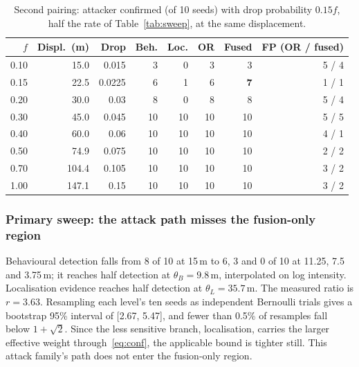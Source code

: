 \begin{table}[!t]
\caption{Second pairing: attacker confirmed (of 10 seeds) with drop probability
$0.15f$, half the rate of Table~\ref{tab:sweep}, at the same displacement.}
\label{tab:sweep2}
\centering
\small
\setlength{\tabcolsep}{4pt}
\begin{tabular}{@{}rrrrrrrr@{}}
\toprule
$f$ & Displ.\ (m) & Drop & Beh. & Loc. & OR & Fused & FP (OR / fused) \\
\midrule
0.10 & 15.0 & 0.015 & 3 & 0 & 3 & 3 & 5 / 4 \\
0.15 & 22.5 & 0.0225 & 6 & 1 & 6 & \textbf{7} & 1 / 1 \\
0.20 & 30.0 & 0.03 & 8 & 0 & 8 & 8 & 5 / 4 \\
0.30 & 45.0 & 0.045 & 10 & 10 & 10 & 10 & 5 / 5 \\
0.40 & 60.0 & 0.06 & 10 & 10 & 10 & 10 & 4 / 1 \\
0.50 & 74.9 & 0.075 & 10 & 10 & 10 & 10 & 2 / 2 \\
0.70 & 104.4 & 0.105 & 10 & 10 & 10 & 10 & 3 / 2 \\
1.00 & 147.1 & 0.15 & 10 & 10 & 10 & 10 & 3 / 2 \\
\bottomrule
\end{tabular}
\end{table}

\subsubsection{Primary sweep: the attack path misses the fusion-only region}

Behavioural detection falls from 8 of 10 at 15\,m to 6, 3 and 0 of 10 at 11.25,
7.5 and 3.75\,m; it reaches half detection at $\theta_B = 9.8$\,m, interpolated
on log intensity. Localisation evidence reaches half detection at
$\theta_L = 35.7$\,m. The measured ratio is $r = 3.63$. Resampling each level's
ten seeds as independent Bernoulli trials gives a bootstrap 95\% interval of
[2.67, 5.47], and fewer than 0.5\% of resamples fall below $1+\sqrt2$. Since
the less sensitive branch, localisation, carries the larger effective weight
through~\eqref{eq:conf}, the applicable bound is tighter still. This attack
family's path does not enter the fusion-only region.

